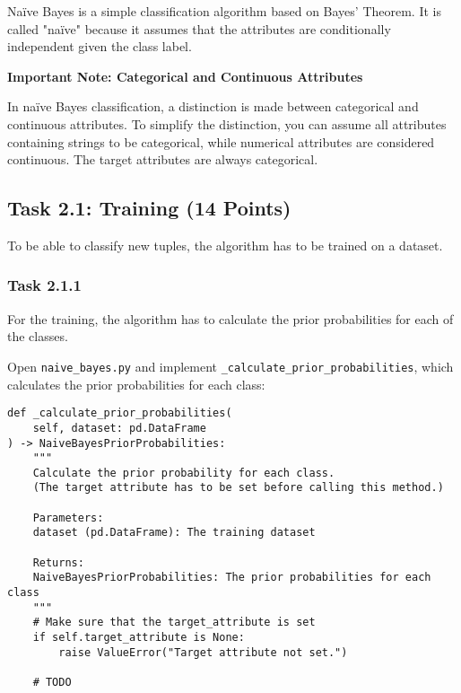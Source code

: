 \documentclass[
english,
smallborders
]{i6prcsht}
\newcommand{\points}[1]{\hfill \color{red}(#1 Points)\color{black}}
\begin{document}
Naïve Bayes is a simple classification algorithm based on Bayes' Theorem. It is called "naïve" because it assumes that the attributes are conditionally independent given the class label.

\vspace*{1mm}

\begin{mdframed}
	\begin{em}
		\textbf{Important Note: Categorical and Continuous Attributes}

		In naïve Bayes classification, a distinction is made between categorical and continuous attributes. To simplify the distinction, you can assume all attributes containing strings to be categorical, while numerical attributes are considered continuous. The target attributes are always categorical.
	\end{em}
\end{mdframed}

\subsection*{Task 2.1: Training \points{14}}

To be able to classify new tuples, the algorithm has to be trained on a dataset.

\subsubsection*{Task 2.1.1}

For the training, the algorithm has to calculate the prior probabilities for each of the classes.

Open \texttt{naive\_bayes.py} and implement \texttt{\_calculate\_prior\_probabilities}, which calculates the prior probabilities for each class:

\vspace*{0.3cm}

\begin{lstlisting}
def _calculate_prior_probabilities(
	self, dataset: pd.DataFrame
) -> NaiveBayesPriorProbabilities:
	"""
	Calculate the prior probability for each class.
	(The target attribute has to be set before calling this method.)

	Parameters:
	dataset (pd.DataFrame): The training dataset

	Returns:
	NaiveBayesPriorProbabilities: The prior probabilities for each class
	"""
	# Make sure that the target_attribute is set
	if self.target_attribute is None:
		raise ValueError("Target attribute not set.")

	# TODO
\end{lstlisting}
\end{document}
